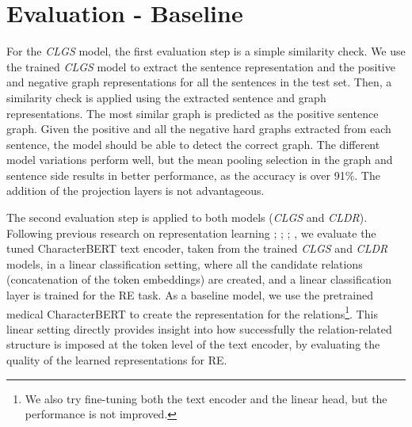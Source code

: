 \documentclass[11pt]{article}
\begin{document}
\section{Evaluation - Baseline}

For the \textit{CLGS} model, the first evaluation step is a simple similarity check. We use the trained \textit{CLGS} model to extract the sentence representation and the positive and negative graph representations for all the sentences in the test set. Then, a similarity check is applied using the extracted sentence and graph representations. The most similar graph is predicted as the positive sentence graph. Given the positive and all the negative hard graphs extracted from each sentence, the model should be able to detect the correct graph. The different model variations perform well, but the mean pooling selection in the graph and sentence side results in better performance, as the accuracy is over 91\%. The addition of the projection layers is not advantageous.

\begin{table}[!ht]
    \centering
    \caption{Results - \textit{CLGS} model: Finding the correct graph with similarity check}
\end{table}

\vspace{-3mm}
The second evaluation step is applied to both models (\textit{CLGS} and \textit{CLDR}). Following previous research on representation learning \cite{henaff2020data}; \cite{chen2020simple}; \cite{he2020momentum}; \cite{zhang2020contrastive}, we evaluate the tuned CharacterBERT text encoder, taken from the trained \textit{CLGS} and \textit{CLDR} models, in a linear classification setting, where all the candidate relations (concatenation of the token embeddings) are created, and a linear classification layer is trained for the RE task. As a baseline model, we use the pretrained medical CharacterBERT to create the representation for the relations\footnote{We also try fine-tuning both the text encoder and the linear head, but the performance is not improved.}. This linear setting directly provides insight into how successfully the relation-related structure is imposed at the token level of the text encoder, by evaluating the quality of the learned representations for RE. 
\end{document}
